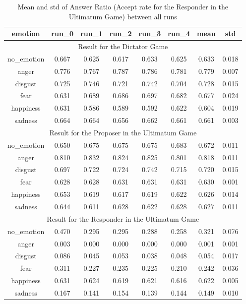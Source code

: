 \documentclass{article}
\begin{document}
\begin{table}[!ht]
\centering
\caption{Mean and std of Answer Ratio (Accept rate for the Responder in the Ultimatum Game) between all runs}
\label{tab: a_mean_std_by_run}
\begin{tabular}{cccccccc}
\hline
\textbf{emotion} & \textbf{run\_0} & \textbf{run\_1} & \textbf{run\_2} & \textbf{run\_3} & \textbf{run\_4} & \textbf{mean} & \textbf{std} \\
\hline
\multicolumn{8}{c}{Result for the Dictator Game} \\
\hline
no\_emotion & 0.667  & 0.625  & 0.617  & 0.633  & 0.625  & 0.633 & 0.018  \\
anger       & 0.776  & 0.767  & 0.787  & 0.786  & 0.781  & 0.779 & 0.007  \\
disgust     & 0.725  & 0.746  & 0.721  & 0.742  & 0.704  & 0.728 & 0.015  \\
fear        & 0.631  & 0.689  & 0.686  & 0.697  & 0.682  & 0.677 & 0.024  \\
happiness   & 0.631  & 0.586  & 0.589  & 0.592  & 0.622  & 0.604 & 0.019  \\
sadness     & 0.664  & 0.664  & 0.656  & 0.662  & 0.661  & 0.661 & 0.003  \\
\hline
\multicolumn{8}{c}{Result for the Proposer in the Ultimatum Game} \\
no\_emotion & 0.650  & 0.675  & 0.675  & 0.675  & 0.683  & 0.672 & 0.011  \\
anger       & 0.810  & 0.832  & 0.824  & 0.825  & 0.801  & 0.818 & 0.011  \\
disgust     & 0.697  & 0.722  & 0.724  & 0.742  & 0.715  & 0.720 & 0.015  \\
fear        & 0.628  & 0.628  & 0.631  & 0.631  & 0.631  & 0.630 & 0.001  \\
happiness   & 0.653  & 0.619  & 0.617  & 0.619  & 0.622  & 0.626 & 0.014  \\
sadness     & 0.644  & 0.611  & 0.628  & 0.622  & 0.628  & 0.627 & 0.011  \\
\hline
\multicolumn{8}{c}{Result for the Responder in the Ultimatum Game} \\
no\_emotion & 0.470  & 0.295  & 0.295  & 0.288  & 0.258  & 0.321 & 0.076  \\
anger       & 0.003  & 0.000  & 0.000  & 0.000  & 0.000  & 0.001 & 0.001  \\
disgust     & 0.086  & 0.045  & 0.053  & 0.038  & 0.048  & 0.054 & 0.017  \\
fear        & 0.311  & 0.227  & 0.235  & 0.225  & 0.210  & 0.242 & 0.036  \\
happiness   & 0.631  & 0.624  & 0.619  & 0.621  & 0.616  & 0.622 & 0.005  \\
sadness     & 0.167  & 0.141  & 0.154  & 0.139  & 0.144  & 0.149 & 0.010 \\
\hline
\end{tabular}
\end{table}
\end{document}
